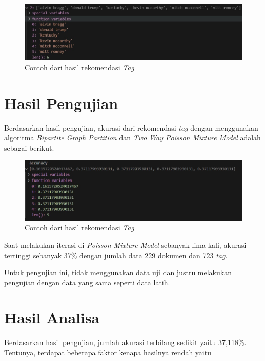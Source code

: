 \begin{figure}[H]
  \centering
  \includegraphics[width=1\textwidth]{gambar/bab_4_image/rekomendasi tag.jpg}
  \caption{Contoh dari hasil rekomendasi \textit{Tag}}
  \label{gambar:rekomendasiTag}
\end{figure}

\section{Hasil Pengujian}

Berdasarkan hasil pengujian, akurasi dari rekomendasi \textit{tag} 
dengan menggunakan algoritma \textit{Bipartite Graph Partition}
dan \textit{Two Way Poisson Mixture Model} adalah sebagai berikut.


\begin{figure}[H]
  \centering
  \includegraphics[width=1\textwidth]{gambar/bab_4_image/Akurasi.jpg}
  \caption{Contoh dari hasil rekomendasi \textit{Tag}}
  \label{gambar:akurasi}
\end{figure}

Saat melakukan iterasi di \textit{Poisson Mixture Model} sebanyak lima kali,
akurasi tertinggi sebanyak 37\% dengan jumlah data 229 dokumen dan 723 \textit{tag}.

Untuk pengujian ini, tidak menggunakan data uji dan justru melakukan pengujian dengan data yang sama
seperti data latih. 

\section{Hasil Analisa}

Berdasarkan hasil pengujian, jumlah akurasi terbilang sedikit yaitu 37,118\%. Tentunya, terdapat
beberapa faktor kenapa hasilnya rendah yaitu

